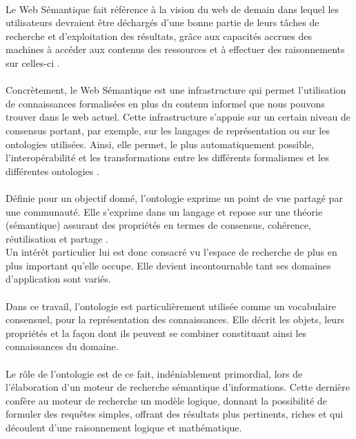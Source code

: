 \documentclass[12pt, a4paper, oneside]{book}
\begin{document}
\paragraph{}
Le Web  Sémantique fait référence à la vision du  web de demain dans lequel les utilisateurs devraient être déchargés d’une bonne partie de leurs tâches de recherche et d’exploitation des résultats, grâce  aux  capacités  accrues  des  machines  à  accéder  aux  contenus  des  ressources  et  à  effectuer  des raisonnements sur celles-ci \citep{ws}.
\paragraph{}
Concrètement, le Web Sémantique est une infrastructure qui permet l’utilisation de connaissances formalisées    en plus du contenu informel que nous pouvons trouver dans le web actuel. Cette infrastructure s’appuie sur un certain niveau de consensus portant, par exemple, sur les langages de représentation ou sur les ontologies  utilisées.  Ainsi, elle permet, le plus automatiquement possible, l’interopérabilité et les transformations entre les différents formalismes et les différentes ontologies \citep{timBerners}.
 
\paragraph{}

Définie pour un objectif donné, l’ontologie exprime un point de vue partagé par une communauté. Elle s’exprime dans un langage et repose sur une théorie (sémantique) assurant des propriétés en termes de consensus, cohérence, réutilisation et partage \citep{charlet}. \\

Un intérêt particulier lui est donc consacré vu l’espace de recherche de plus en plus important qu’elle occupe. Elle devient incontournable tant ses domaines d’application sont variés.

\paragraph{}

Dans ce travail, l'ontologie est particulièrement utilisée comme un vocabulaire consensuel, pour la représentation des connaissances. Elle décrit les objets, leurs propriétés et la façon dont ils peuvent se combiner constituant ainsi les connaissances du domaine.
\paragraph{}
Le rôle de l'ontologie est de ce fait, indéniablement primordial, lors de l'élaboration d'un moteur de recherche sémantique d'informations. Cette dernière confère au moteur de recherche un modèle logique, donnant la possibilité de formuler des requêtes simples, offrant des résultats plus pertinents, riches et qui découlent d'une raisonnement logique et mathématique.
\end{document}
